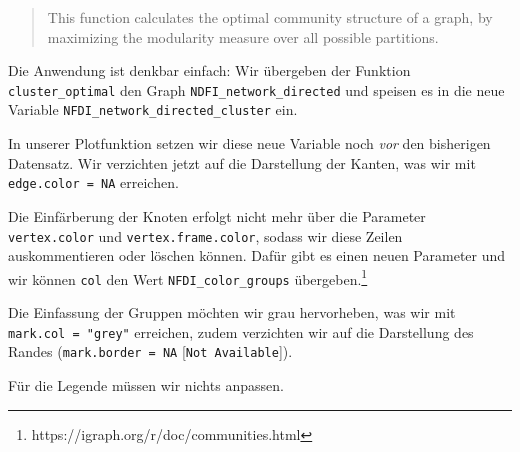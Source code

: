 \documentclass[11pt]{article}
\begin{document}
\begin{quote}
This function calculates the optimal community structure of a graph, by
maximizing the modularity measure over all possible partitions.
\end{quote}

Die Anwendung ist denkbar einfach: Wir übergeben der Funktion
\texttt{cluster\_optimal} den Graph \texttt{NDFI\_network\_directed} und
speisen es in die neue Variable
\texttt{NFDI\_network\_directed\_cluster} ein.

    In unserer Plotfunktion setzen wir diese neue Variable noch \emph{vor}
den bisherigen Datensatz. Wir verzichten jetzt auf die Darstellung der
Kanten, was wir mit \texttt{edge.color\ =\ NA} erreichen.

Die Einfärberung der Knoten erfolgt nicht mehr über die Parameter
\texttt{vertex.color} und \texttt{vertex.frame.color}, sodass wir diese
Zeilen auskommentieren oder löschen können. Dafür gibt es einen neuen
Parameter und wir können \texttt{col} den Wert
\texttt{NFDI\_color\_groups} übergeben.\footnote{https://igraph.org/r/doc/communities.html}

Die Einfassung der Gruppen möchten wir grau hervorheben, was wir mit
\texttt{mark.col\ =\ "grey"} erreichen, zudem verzichten wir auf die
Darstellung des Randes (\texttt{mark.border\ =\ NA}
{[}\texttt{Not\ Available}{]}).

Für die Legende müssen wir nichts anpassen.
\end{document}
